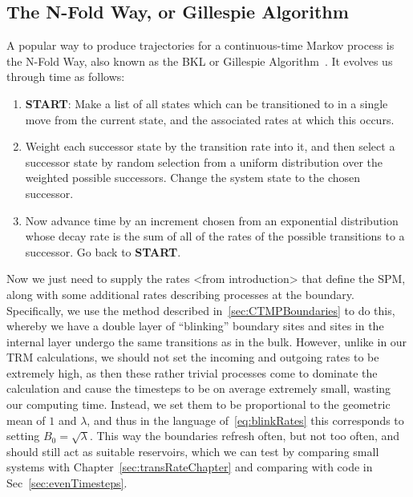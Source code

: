 \subsection{The N-Fold Way, or Gillespie Algorithm} \label{sec:nFoldWay}
A popular way to produce trajectories for a continuous-time Markov process is the N-Fold Way, also known as the
BKL or Gillespie Algorithm~\cite{Bortz1975, Prados1997, voterKMC}. It evolves us through time as follows:
\begin{enumerate}
 \item \textbf{START}: Make a list of all states which can be transitioned to in a single move from the 
 current state, and the associated rates at which this occurs.
 \item Weight each successor state by the transition rate into it, and then select a successor state by
 random selection from a uniform distribution over the weighted possible successors. Change the system
 state to the chosen successor. \label{weightingChoose}
 \item Now advance time by an increment chosen from an exponential distribution whose decay rate 
 is the sum of all of the rates of the possible transitions to a successor. Go back to \textbf{START}. \label{timestepChoose}
\end{enumerate}
Now we just need to supply the rates <from introduction> that define the SPM, along with some additional rates describing processes at the boundary. Specifically, we use the method described 
in~\ref{sec:CTMPBoundaries} to do this, whereby we have a double layer of ``blinking'' boundary sites
and sites in the internal layer undergo the same transitions as in the bulk. However, unlike in our TRM
calculations, we should not set the incoming and outgoing rates to be extremely high, as then these rather
trivial processes come to dominate the calculation and cause the timesteps to be on average extremely small, wasting our computing time. Instead, we set them to
be proportional to the geometric mean of $1$ and $\lambda$, and thus in the language of~\ref{eq:blinkRates}
this corresponds to setting $B_0 = \sqrt{\lambda}$. This way the boundaries refresh often, but not too
often, and should still act as suitable reservoirs, which we can test by comparing small systems with 
Chapter~\ref{sec:transRateChapter} and comparing with code in Sec~\ref{sec:evenTimesteps}.


